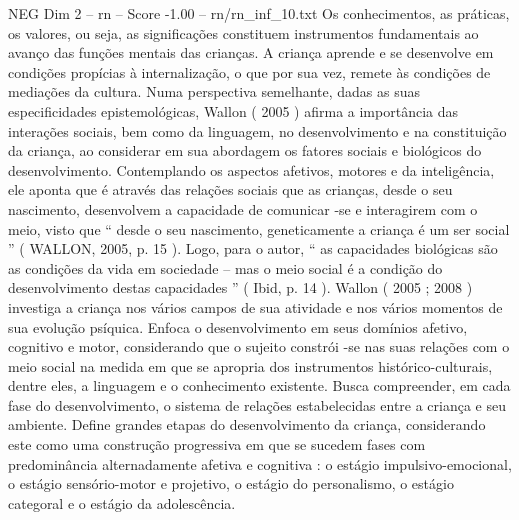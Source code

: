 \begin{textsample}{NEG Dim 2 – rn – Score -1.00 – rn/rn\_inf\_10.txt}
Os conhecimentos, as práticas, os valores, ou seja, as significações constituem instrumentos fundamentais ao avanço das funções mentais das crianças.
A criança aprende e se desenvolve em condições propícias à internalização, o que por sua vez, remete às condições de mediações da cultura.
Numa perspectiva semelhante, dadas as suas especificidades epistemológicas, Wallon ( 2005 ) afirma a importância das interações sociais, bem como da linguagem, no desenvolvimento e na constituição da criança, ao considerar em sua abordagem os fatores sociais e biológicos do desenvolvimento.
Contemplando os aspectos afetivos, motores e da inteligência, ele aponta que é através das relações sociais que as crianças, desde o seu nascimento, desenvolvem a capacidade de comunicar -se e interagirem com o meio, visto que “ desde o seu nascimento, geneticamente a criança é um ser social ” ( WALLON, 2005, p. 15 ).
Logo, para o autor, “ as capacidades biológicas são as condições da vida em sociedade – mas o meio social é a condição do desenvolvimento destas capacidades ” ( Ibid, p. 14 ).
Wallon ( 2005 ; 2008 ) investiga a criança nos vários campos de sua atividade e nos vários momentos de sua evolução psíquica.
Enfoca o desenvolvimento em seus domínios afetivo, cognitivo e motor, considerando que o sujeito constrói -se nas suas relações com o meio social na medida em que se apropria dos instrumentos histórico-culturais, dentre eles, a linguagem e o conhecimento existente.
Busca compreender, em cada fase do desenvolvimento, o sistema de relações estabelecidas entre a criança e seu ambiente.
Define grandes etapas do desenvolvimento da criança, considerando este como uma construção progressiva em que se sucedem fases com predominância alternadamente afetiva e cognitiva : o estágio impulsivo-emocional, o estágio sensório-motor e projetivo, o estágio do personalismo, o estágio categoral e o estágio da adolescência.

\end{textsample}
